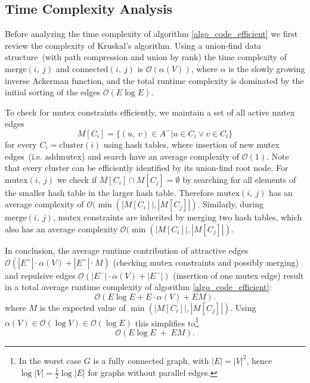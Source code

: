 
\subsection{Time Complexity Analysis}



Before analyzing the time complexity of algorithm \ref{algo_code_efficient} we first review the complexity of Kruskal's algorithm. Using a union-find data structure~(with path compression and union by rank) the time complexity of $\mathrm{merge}(i,~j)$ and $\mathrm{connected}(i,~j)$ is $\mathcal{O}(\alpha(V))$, where $\alpha$ is the slowly growing inverse Ackerman function, and the total runtime complexity is dominated by the initial sorting of the edges $\mathcal{O}(E \log E)$\cite{cormen2009introduction}.


\noindent To check for mutex constraints efficiently, we maintain a set of all active mutex edges $$ M[C_i] = \{(u,~v) \in A^- | u \in C_i \lor v \in C_i\} $$ for every $C_i = \mathrm{cluster}(i)$ using hash tables, where insertion of new mutex edges~(i.e. $\mathrm{addmutex}$) and search have an average complexity of $\mathcal{O}(1)$. Note that every cluster can be efficiently identified by its union-find root node.
For $\mathrm{mutex}(i,~j)$ we check if $M[C_i] \cap M[C_j] = \emptyset$ by searching for all elements of the smaller hash table in the larger hash table. Therefore $\mathrm{mutex}(i,~j)$ has an average complexity of $\mathcal{O}(\min (|M[C_i]|, |M[C_j]|)$. %
Similarly, during $\mathrm{merge}(i,~j)$, mutex constraints are inherited  by merging two hash tables, which also has an average complexity $\mathcal{O}(\min (|M[C_i]|, |M[C_j]|)$.

\noindent In conclusion, the average runtime contribution of attractive edges $\mathcal{O}(|E^{+}| \cdot\alpha(V) + |E^{+}| \cdot M)$ (checking mutex constraints and possibly merging) and repulsive edges
 $\mathcal{O}(|E^{-}| \cdot \alpha(V) + |E^{-}|) $ (insertion of one mutex edge) result in a total average runtime complexity of algorithm \ref{algo_code_efficient}:
 \vspace{-0.1cm}
    \begin{equation}
        \mathcal{O}(E \log E + E  \cdot  \alpha(V) + EM).
    \end{equation}
where $M$ is the expected value of $\min (|M[C_i]|, |M[C_j]|)$. Using $\alpha(V) \in \mathcal{O}(\log V) \in \mathcal{O}(\log E) $ this simplifies to\footnote{In the worst case $G$ is a fully connected graph, with $|E|=|V|^2$, hence $\log |V| = \frac{1}{2} \log |E|$ for graphs without parallel edges.}
    \begin{equation}
         \mathcal{O}(E \log E \;+\; EM).
    \end{equation}


